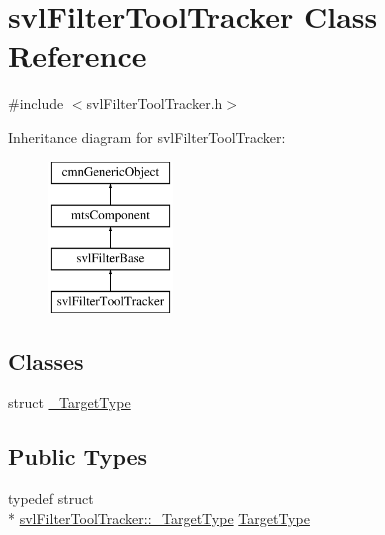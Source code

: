 \hypertarget{classsvl_filter_tool_tracker}{\section{svl\-Filter\-Tool\-Tracker Class Reference}
\label{classsvl_filter_tool_tracker}
}


{\ttfamily \#include $<$svl\-Filter\-Tool\-Tracker.\-h$>$}

Inheritance diagram for svl\-Filter\-Tool\-Tracker\-:\begin{figure}[H]
\begin{center}
\leavevmode
\includegraphics[height=4.000000cm]{d5/d28/classsvl_filter_tool_tracker}
\end{center}
\end{figure}
\subsection*{Classes}
\begin{DoxyCompactItemize}
\item 
struct \hyperlink{structsvl_filter_tool_tracker_1_1___target_type}{\-\_\-\-Target\-Type}
\end{DoxyCompactItemize}
\subsection*{Public Types}
\begin{DoxyCompactItemize}
\item 
typedef struct \\*
\hyperlink{structsvl_filter_tool_tracker_1_1___target_type}{svl\-Filter\-Tool\-Tracker\-::\-\_\-\-Target\-Type} \hyperlink{classsvl_filter_tool_tracker_a3fe48b9f9a53caf0f5df9e96b1ccc38e}{Target\-Type}
\end{DoxyCompactItemize}
